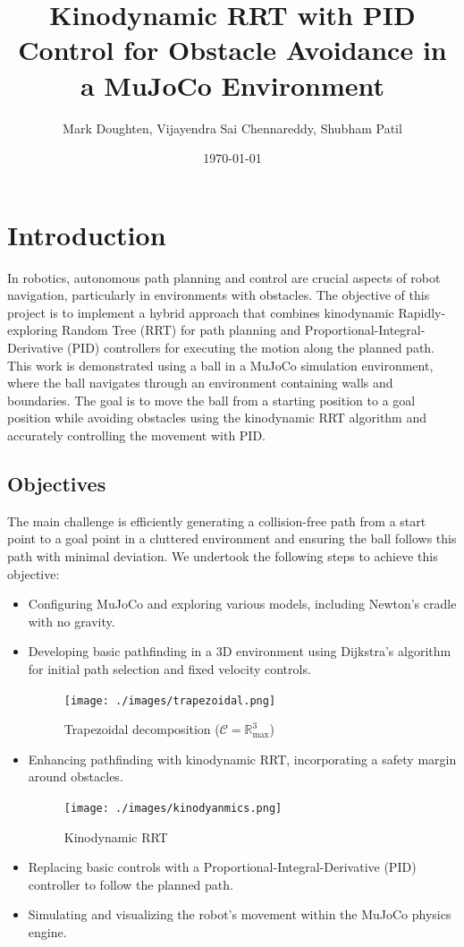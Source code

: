 \documentclass[12pt]{article}
\title{Kinodynamic RRT with PID Control for Obstacle Avoidance in a MuJoCo Environment}
\author{Mark Doughten, Vijayendra Sai Chennareddy, Shubham Patil}
\date{\today}
\begin{document}
\maketitle

\section{Introduction}
In robotics, autonomous path planning and control are crucial aspects of robot navigation, particularly in environments with obstacles. The objective of this project is to implement a hybrid approach that combines kinodynamic Rapidly-exploring Random Tree (RRT) for path planning and Proportional-Integral-Derivative (PID) controllers for executing the motion along the planned path. This work is demonstrated using a ball in a MuJoCo simulation environment, where the ball navigates through an environment containing walls and boundaries. The goal is to move the ball from a starting position to a goal position while avoiding obstacles using the kinodynamic RRT algorithm and accurately controlling the movement with PID.

\subsection{Objectives}
The main challenge is efficiently generating a collision-free path from a start point to a goal point in a cluttered environment and ensuring the ball follows this path with minimal deviation. We undertook the following steps to achieve this objective:
\begin{itemize}
    \item Configuring MuJoCo and exploring various models, including Newton’s cradle with no gravity.
    \item Developing basic pathfinding in a 3D environment using Dijkstra’s algorithm for initial path selection and fixed velocity controls.
    \begin{figure}[h!]
        \centering
        \texttt{[image: ./images/trapezoidal.png]}
        \caption{Trapezoidal decomposition (\(\mathcal{C} = \mathbb{R}^3_{\text{max}}\))}
        \label{fig:trapezoidal}
    \end{figure}
    \item Enhancing pathfinding with kinodynamic RRT, incorporating a safety margin around obstacles.
    \begin{figure}[h!]
        \centering
        \texttt{[image: ./images/kinodyanmics.png]}
        \caption{Kinodynamic RRT}
        \label{fig:kinodynamic}
    \end{figure}
    \item Replacing basic controls with a Proportional-Integral-Derivative (PID) controller to follow the planned path.
    \item Simulating and visualizing the robot’s movement within the MuJoCo physics engine.
\end{itemize}
\end{document}
